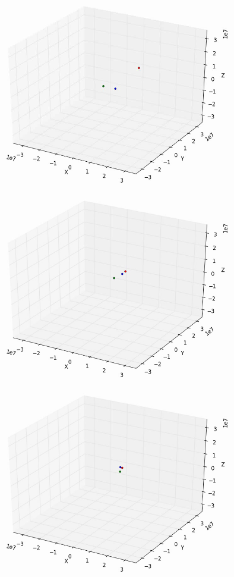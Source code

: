 \documentclass[10pt,letterpaper]{article}
\begin{document}
\begin{figure}[!htb]
  \includegraphics[width=\linewidth]{figures/three_body/4_1.png}
  \subcaption{}\label{fig:4_1}
\endminipage\hfill
{}
  \includegraphics[width=\linewidth]{figures/three_body/4_2.png}
  \subcaption{}\label{fig:4_2}
\endminipage\hfill
{}
  \includegraphics[width=\linewidth]{figures/three_body/4_3.png}

\end{figure}
\end{document}
